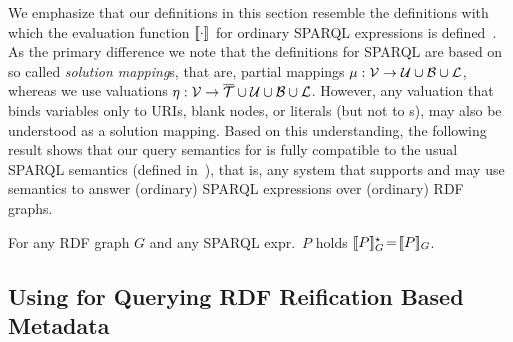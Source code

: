 \noindent
% 
We emphasize that our definitions in this section resemble the definitions with which
the evaluation function $[\![\cdot]\!]_{ }$ for ordinary SPARQL
	expressions is defined~\cite{Perez09:SemanticsAndComplexityOfSPARQL}.
As the primary difference we note that the definitions for SPARQL are based on so called \emph{solution mapping}s, that are, partial mappings $\mu : \mathcal{V} \rightarrow \mathcal{U} \cup \mathcal{B} \cup \mathcal{L}$, whereas we use valuations $\eta : \mathcal{V} \rightarrow \overline{\mathcal{T}} \cup \mathcal{U} \cup \mathcal{B} \cup \mathcal{L}$. However, any valuation
	that binds variables only to URIs, blank nodes, or literals (but not to {\RDFplusTriple}s),
may also be understood as a solution mapping. Based on this understanding, the following result shows that our query semantics for {\SPARQLplus} is fully compatible to the usual SPARQL semantics (defined in~\cite{Perez09:SemanticsAndComplexityOfSPARQL}), that is, any system that supports {\RDFplus} and {\SPARQLplus} may use {\SPARQLplus} semantics to answer (ordinary) SPARQL expressions over (ordinary) RDF graphs.

\begin{proposition} \label{Proposition:EquivalenceOfSemantics}
	For any
	RDF graph $G$ and any
	SPARQL
		expr.~$P$
	holds $[\![P]\!]^\star_{G} \!=\! [\![P]\!]_{G}$.
\end{proposition}

% 
% 


\subsection{Using {\SPARQLplus} for Querying RDF Reification Based Metadata}

